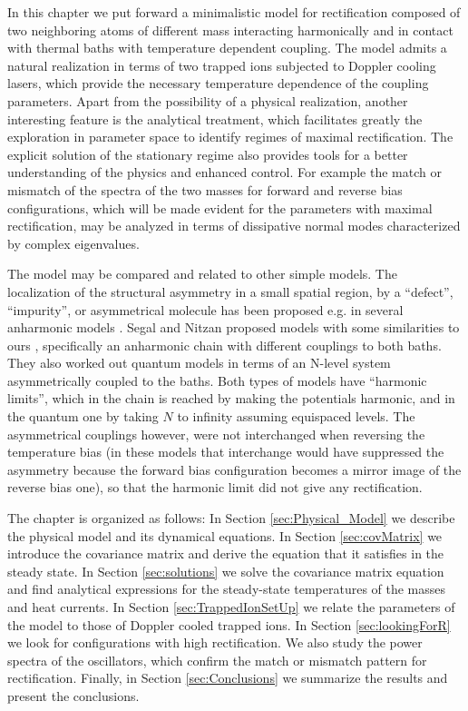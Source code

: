 In this chapter we put forward a minimalistic model for rectification composed of two neighboring atoms of different mass interacting harmonically and in contact with thermal baths with temperature dependent coupling. The model admits a  natural realization in terms of two trapped ions subjected to  Doppler cooling lasers, which provide the
necessary temperature dependence of the coupling parameters. Apart from the possibility of a physical realization, another interesting
feature is the analytical treatment, which facilitates greatly the exploration in parameter  space to  identify regimes of maximal rectification. The explicit solution of the stationary regime also provides tools for a better understanding of the physics and enhanced control. For example the match or mismatch of the spectra of the two masses for forward and reverse bias configurations, which will be made evident for the parameters with maximal
rectification, may be analyzed in terms of dissipative normal modes characterized by complex eigenvalues.

The model may be compared and related to other simple models. The localization of the
structural asymmetry in a  small spatial region, by a ``defect'', ``impurity'', or asymmetrical molecule has been proposed e.g. in
several anharmonic models \cite{Segal2005b,Pons2017,Alexander2020}.
Segal and Nitzan proposed models with some similarities to ours \cite{Segal2005,Segal2005b}, specifically an anharmonic chain
with different couplings to both baths. They also worked out  quantum models \cite{Segal2005,Segal2005b} in terms of an N-level
system asymmetrically coupled to the baths. Both types of models have ``harmonic limits'', which in the chain is reached by making the potentials
harmonic, and in the quantum one by taking $N$ to infinity assuming equispaced levels.
The asymmetrical couplings however, were not interchanged when reversing the temperature bias
(in these models that interchange would have suppressed the asymmetry because the forward bias configuration becomes a mirror image of the reverse bias one), so that
the harmonic limit did not give any rectification.

The chapter is organized as follows: In Section \ref{sec:Physical_Model}
we describe the physical model and its dynamical equations. In Section \ref{sec:covMatrix} we introduce the  covariance matrix and  derive the equation  that it satisfies in the steady state. In Section \ref{sec:solutions} we solve the covariance matrix equation and find analytical expressions for the steady-state temperatures of the masses and heat currents. In Section \ref{sec:TrappedIonSetUp} we relate the parameters of the model to those of Doppler cooled trapped ions. In Section \ref{sec:lookingForR} we look for configurations with high rectification. We also study the power spectra of the oscillators, which confirm the match or mismatch pattern for rectification. Finally, in Section \ref{sec:Conclusions} we summarize the results and present the conclusions.

